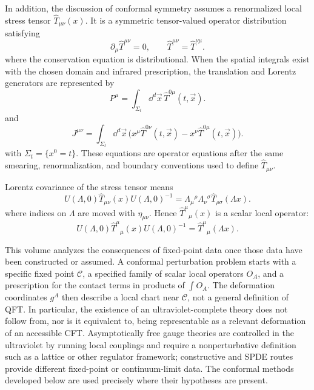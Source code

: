 In addition, the discussion of conformal symmetry assumes a renormalized
local stress tensor \(\widehat T_{\mu\nu}(x)\).  It is a symmetric tensor-valued
operator distribution satisfying
\begin{equation}
  \partial_\mu\widehat T^{\mu\nu}=0,
  \qquad
  \widehat T^{\mu\nu}=\widehat T^{\nu\mu}.
  \label{eq:cft-opening-stress-conservation}
\end{equation}
where the conservation equation is distributional.  When the spatial
integrals exist with the chosen domain and infrared prescription, the
translation and Lorentz generators are represented by
\begin{equation}
  P^\mu
  =
  \int_{\Sigma_t}\dd^d\vec x\,
  \widehat T^{0\mu}(t,\vec x).
  \label{eq:cft-opening-p-charge}
\end{equation}
and
\begin{equation}
  J^{\mu\nu}
  =
  \int_{\Sigma_t}\dd^d\vec x\,
  \bigl(
    x^\mu\widehat T^{0\nu}(t,\vec x)
    -
    x^\nu\widehat T^{0\mu}(t,\vec x)
  \bigr).
  \label{eq:cft-opening-j-charge}
\end{equation}
with \(\Sigma_t=\{x^0=t\}\).  These equations are operator equations after
the same smearing, renormalization, and boundary conventions used to define
\(\widehat T_{\mu\nu}\).

Lorentz covariance of the stress tensor means
\begin{equation}
  U(\Lambda,0)\widehat T_{\mu\nu}(x)U(\Lambda,0)^{-1}
  =
  \Lambda_\mu{}^\rho\Lambda_\nu{}^\sigma
  \widehat T_{\rho\sigma}(\Lambda x).
  \label{eq:cft-opening-stress-lorentz}
\end{equation}
where indices on \(\Lambda\) are moved with \(\eta_{\mu\nu}\).  Hence
\(\widehat T^\mu{}_\mu(x)\) is a scalar local operator:
\[
  U(\Lambda,0)\widehat T^\mu{}_\mu(x)U(\Lambda,0)^{-1}
  =
  \widehat T^\mu{}_\mu(\Lambda x).
\]

\begin{remark}
\label{rem:cft-volume-perturbation-scope}
This volume analyzes the consequences of fixed-point data once those data have
been constructed or assumed.  A conformal perturbation problem starts with a
specific fixed point \(\mathcal C\), a specified family of scalar local
operators \(O_A\), and a prescription for the contact terms in products of
\(\int O_A\).  The deformation coordinates \(g^A\) then describe a local
chart near \(\mathcal C\), not a general definition of QFT.  In particular,
the existence of an ultraviolet-complete theory does not follow from, nor is
it equivalent to, being representable as a relevant deformation of an
accessible CFT.  Asymptotically free gauge theories are controlled in the
ultraviolet by running local couplings and require a nonperturbative
definition such as a lattice or other regulator framework; constructive and
SPDE routes provide different fixed-point or continuum-limit data.  The
conformal methods developed below are used precisely where their hypotheses
are present.
\end{remark}

